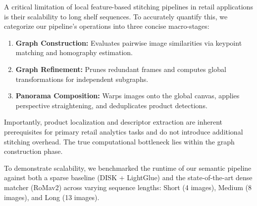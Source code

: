 \documentclass[10pt,twocolumn,letterpaper]{article}
\begin{document}
A critical limitation of local feature-based stitching pipelines in retail applications is their scalability to long shelf sequences. To accurately quantify this, we categorize our pipeline's operations into three concise macro-stages:

\begin{enumerate}
    \item \textbf{Graph Construction:} Evaluates pairwise image similarities via keypoint matching and homography estimation.
    \item \textbf{Graph Refinement:} Prunes redundant frames and computes global transformations for independent subgraphs.
    \item \textbf{Panorama Composition:} Warps images onto the global canvas, applies perspective straightening, and deduplicates product detections.
\end{enumerate}

Importantly, product localization and descriptor extraction are inherent prerequisites for primary retail analytics tasks and do not introduce additional stitching overhead. The true computational bottleneck lies within the graph construction phase.

To demonstrate scalability, we benchmarked the runtime of our semantic pipeline against both a sparse baseline (DISK + LightGlue) and the state-of-the-art dense matcher (RoMav2) across varying sequence lengths: Short (4 images), Medium (8 images), and Long (13 images).
\end{document}
